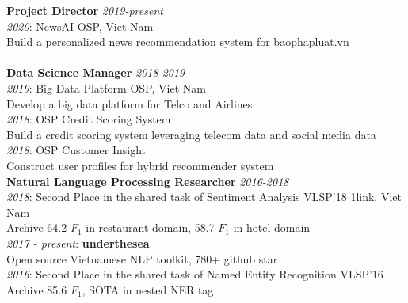 \documentclass[11pt,a4paper,roman]{article}
\begin{document}
\textbf{Project Director}
\hfill
\textit{2019-present}
\\
\textit{2020}: NewsAI
\hfill
OSP, Viet Nam
\\
Build a personalized news recommendation system for baophapluat.vn
\\\\
\textbf{Data Science Manager}
\hfill
\textit{2018-2019}
\\
\textit{2019}: Big Data Platform
\hfill
OSP, Viet Nam
\\
Develop a big data platform for Telco and Airlines
\\
\textit{2018}: OSP Credit Scoring System
\\
Build a credit scoring system leveraging telecom data and social media data
\\
\textit{2018}: OSP Customer Insight
\\
Construct user profiles for hybrid recommender system
\\


\noindent
\textbf{Natural Language Processing Researcher}
\hfill
\textit{2016-2018}
\\
\textit{2018}: Second Place in the shared task of Sentiment Analysis VLSP'18
\hfill
1link, Viet Nam
\\
Archive 64.2 $F_{1}$ in restaurant domain, 58.7 $F_{1}$ in hotel domain
\\
\textit{2017 - present}: \textbf{underthesea}
\\\noindent
Open source Vietnamese NLP toolkit, 780+ github star
\\
\textit{2016}: Second Place in the shared task of Named Entity Recognition VLSP'16
\\
Archive 85.6 $F_{1}$, SOTA in nested NER tag
\\
\end{document}
